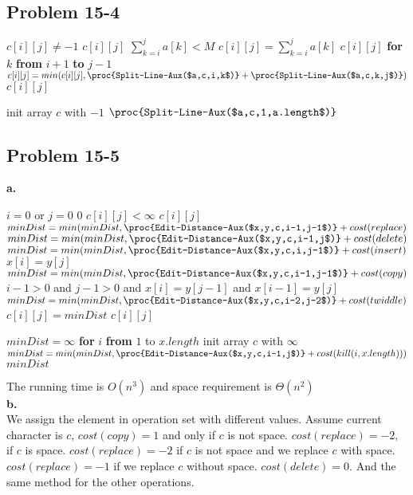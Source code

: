 \documentclass[12pt]{article}
\theoremstyle{definition}
\theoremstyle{remark}
\begin{document}
\subsection*{Problem 15-4}
\begin{codebox}
\li \If $c[i][j]\ne -1$ \label{li:if}
\li \quad \Return $c[i][j]$
\li \If $\sum_{k=i}^ja[k]<M$
\li \quad $c[i][j]=\sum_{k=i}^ja[k]$
\li \quad \Return $c[i][j]$
\li \textbf{for} $k$ \textbf{from} $i+1$ \textbf{to} $j-1$
\li \quad $c[i][j]=min(c[i][j],\proc{Split-Line-Aux($a,c,i,k$)}+\proc{Split-Line-Aux($a,c,k,j$)})$
\li \Return $c[i][j]$
\end{codebox}
\begin{codebox}
\li init array $c$ with $-1$
\li \Return $\proc{Split-Line-Aux($a,c,1,a.length$)}$
\end{codebox}
\subsection*{Problem 15-5}
\textbf{a.}\\
\begin{codebox}
\li \If $i=0$ or $j=0$ \label{li:if}
\li \quad \Return $0$
\li \If $c[i][j]<\infty$ \label{li:if}
\li \quad \Return $c[i][j]$
\li $minDist=min(minDist,\proc{Edit-Distance-Aux($x,y,c,i-1,j-1$)}+cost(replace)$
\li $minDist=min(minDist,\proc{Edit-Distance-Aux($x,y,c,i-1,j$)}+cost(delete)$
\li $minDist=min(minDist,\proc{Edit-Distance-Aux($x,y,c,i,j-1$)}+cost(insert)$
\li \If $x[i]=y[j]$ \label{li:if}
\li \quad $minDist=min(minDist,\proc{Edit-Distance-Aux($x,y,c,i-1,j-1$)}+cost(copy)$
\li \If $i-1>0$ and $j-1>0$ and $x[i]=y[j-1]$ and $x[i-1]=y[j]$ \label{li:if}
\li \quad $minDist=min(minDist,\proc{Edit-Distance-Aux($x,y,c,i-2,j-2$)}+cost(twiddle)$
\li $c[i][j]=minDist$
\li \Return $c[i][j]$
\end{codebox}
\begin{codebox}
\li $minDist=\infty$
\li \textbf{for} $i$ \textbf{from} $1$ to $x.length$
\li \quad init array $c$ with $\infty$
\li \quad $minDist=min(minDist,\proc{Edit-Distance-Aux($x,y,c,i-1,j$)}+cost(kill(i,x.length)))$
\li \Return $minDist$
\end{codebox}
The running time is $O(n^3)$ and space requirement is $\Theta(n^2)$\\
\textbf{b.}\\
We assign the element in operation set with different values. Assume current character is $c$, $cost(copy)=1$ and only if $c$ is not space.
$cost(replace)=-2$, if $c$ is space. $cost(replace)=-2$ if $c$ is not space and we replace $c$ with space. $cost(replace)=-1$ if we replace $c$ without space.
$cost(delete)=0$. And the same method for the other operations.
\end{document}

